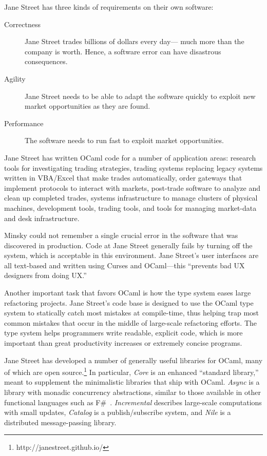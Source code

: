 \documentclass{jfp1}
\begin{document}
Jane Street has three kinds of requirements on their own software:
\begin{description}
\item[Correctness] Jane Street trades billions of dollars every day---
  much more than the company is worth.  Hence, a software error can
  have disastrous consequences.
\item[Agility] Jane Street needs to be able to adapt the software
  quickly to exploit new market opportunities as they are found.
\item[Performance] The software needs to run fast to exploit market
  opportunities.
\end{description}
%
Jane Street has written OCaml code for a number of application areas:
research tools for investigating trading strategies, trading systems
replacing legacy systems written in VBA/Excel that make trades
automatically, order gateways that implement protocols to interact
with markets, post-trade software to analyze and clean up completed
trades, systems infrastructure to manage clusters of physical machines,
development tools, trading tools, and tools for managing market-data
and desk infrastructure.

Minsky could not remember a single crucial error in the software that
was discovered in production. Code at Jane Street generally fails by turning
off the system, which is acceptable in this environment.  Jane
Street's user interfaces are all text-based and written using
Curses and OCaml---this ``prevents bad UX designers from doing UX.''

Another important task that favors OCaml is how the type system eases large
refactoring projects. Jane Street's code base is designed to use the
OCaml type system to statically catch most mistakes at compile-time,
thus helping trap most common mistakes that occur in the middle of 
large-scale refactoring efforts.  The type system helps programmers
write readable, explicit code, which is more important than great
productivity increases or extremely concise programs.

Jane Street has developed a number of generally useful libraries for
OCaml, many of which are open
source.\footnote{http://janestreet.github.io/} In particular,
\textit{Core} is an enhanced ``standard library,'' meant to supplement
the
minimalistic libraries that ship with OCaml.  \textit{Async} is a
library with monadic concurrency abstractions, similar to those
available in other functional languages such as
F\#~\cite{Syme:2011:FAP:1946313.1946334}.  \textit{Incremental}
describes large-scale computations with small updates,
\textit{Catalog} is a publish/subscribe system, and \textit{Nile} is a
distributed message-passing library.
\end{document}
